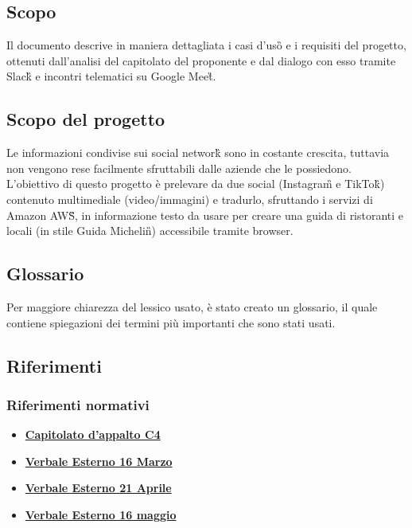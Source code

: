 \subsection{Scopo}
Il documento descrive in maniera dettagliata i casi d'uso\G{} e i requisiti del progetto, ottenuti dall'analisi del capitolato del proponente \proponente{} e dal dialogo con esso tramite Slack\G{} e incontri telematici su Google Meet\G{}.

\subsection{Scopo del progetto}
Le informazioni condivise sui social network\G{} sono in costante crescita, tuttavia non vengono rese facilmente sfruttabili dalle aziende che le possiedono. L'obiettivo di questo progetto è prelevare da due social (Instagram\G{} e TikTok\G{}) contenuto multimediale (video/immagini) e tradurlo, sfruttando i servizi di Amazon AWS\G{}, in informazione testo da usare per creare una guida di ristoranti e locali (in stile Guida Michelin\G{}) accessibile tramite browser. 

\subsection{Glossario}
Per maggiore chiarezza del lessico usato, è stato creato un glossario, il quale 
contiene spiegazioni dei termini più importanti che sono stati usati.

\subsection{Riferimenti}
\subsubsection{Riferimenti normativi}
\begin{itemize}
	\item
	\href{https://www.math.unipd.it/~tullio/IS-1/2021/Progetto/C4.pdf}{\textbf{Capitolato d'appalto C4}}
    \item
    \href{https://github.com/Bug-s-Bunny-Team/docs/blob/dev/src/Esterni/Verbali/ve_20220316.tex}{\textbf{Verbale Esterno 16 Marzo}}
    \item
	\href{https://github.com/Bug-s-Bunny-Team/docs/blob/dev/src/Esterni/Verbali/ve_20220421.tex}{\textbf{Verbale Esterno 21 Aprile}}
    \item
	\href{https://github.com/Bug-s-Bunny-Team/docs/blob/dev/src/Esterni/Verbali/ve_20220516.tex}{\textbf{Verbale Esterno 16 maggio}}

\end{itemize}
